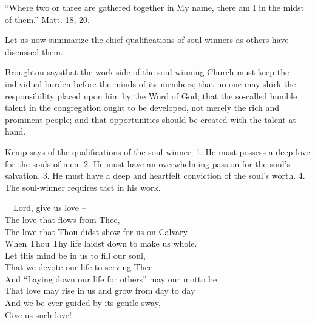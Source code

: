\documentclass[
]{book}
\begin{document}
``Where two or three are gathered together in My name, there am I in the midst of them.'' Matt. 18, 20.

Let us now summarize the chief qualifications of soul-winners as others have discussed them.

Broughton saysthat the work side of the soul-winning Church must keep the individual burden before the minds of its members; that no one may shirk the responsibility placed upon him by the Word of God; that the so-called humble talent in the congregation ought to be developed, not merely the rich and prominent people; and that opportunities should be created with the talent at hand.

Kemp says of the qualifications of the soul-winner; 1. He must possess a deep love for the souls of men. 2. He must have an overwhelming passion for the soul's salvation. 3. He must have a deep and heartfelt conviction of the soul's worth. 4. The soul-winner requires tact in his work.

~~Lord, give us love --\\
\hspace*{0.333em}\hspace*{0.333em}The love that flows from Thee,\\
\hspace*{0.333em}\hspace*{0.333em}The love that Thou didst show for us on Calvary\\
\hspace*{0.333em}\hspace*{0.333em}When Thou Thy life laidst down to make us whole.\\
\hspace*{0.333em}\hspace*{0.333em}Let this mind be in us to fill our soul,\\
\hspace*{0.333em}\hspace*{0.333em}That we devote our life to serving Thee\\
\hspace*{0.333em}\hspace*{0.333em}And ``Laying down our life for others'' may our motto be,\\
\hspace*{0.333em}\hspace*{0.333em}That love may rise in us and grow from day to day\\
\hspace*{0.333em}\hspace*{0.333em}And we be ever guided by its gentle sway, --\\
\hspace*{0.333em}\hspace*{0.333em}Give us such love!
\end{document}
